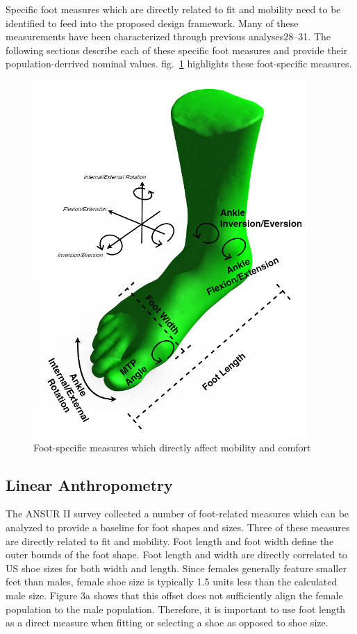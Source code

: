 \documentclass[defaultstyle,11pt]{comps}
\begin{document}
Specific foot measures which are directly related to fit and mobility need to be identified to feed into the proposed design framework.
Many of these measurements have been characterized through previous analyses28--31.
The following sections describe each of these specific foot measures and provide their population-derrived nominal values.
fig.~\ref{fig:SA3-Foot} highlights these foot-specific measures.

\begin{figure}
\hypertarget{fig:SA3-Foot}{%
\centering
\includegraphics{../fig/SA3/FootOverview.png}
\caption{Foot-specific measures which directly affect mobility and comfort}\label{fig:SA3-Foot}
}
\end{figure}

\hypertarget{linear-anthropometry}{%
\subsection{Linear Anthropometry}\label{linear-anthropometry}}

The ANSUR II survey collected a number of foot-related measures which can be analyzed to provide a baseline for foot shapes and sizes\citep{Gordon2014}.
Three of these measures are directly related to fit and mobility.
Foot length and foot width define the outer bounds of the foot shape.
Foot length and width are directly correlated to US shoe sizes for both width and length.
Since females generally feature smaller feet than males, female shoe size is typically 1.5 units less than the calculated male size.
Figure 3a shows that this offset does not sufficiently align the female population to the male population.
Therefore, it is important to use foot length as a direct measure when fitting or selecting a shoe as opposed to shoe size.
\end{document}
